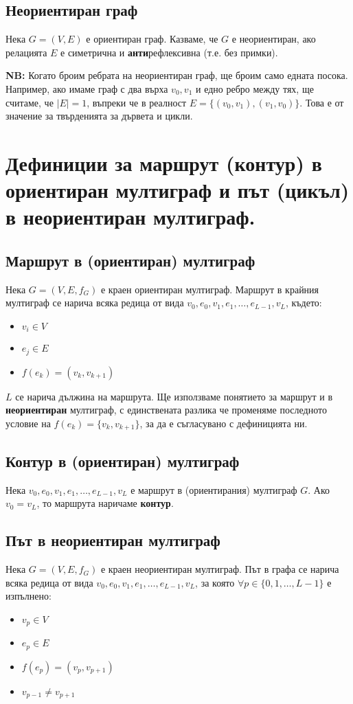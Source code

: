 \documentclass[fleqn,12pt]{article}
\begin{document}
\subsection{Неориентиран граф}
Нека $G = (V, E)$ е ориентиран граф. Казваме, че $G$ е неориентиран, ако релацията $E$ е симетрична и \textbf{анти}рефлексивна (т.е. без примки).

\textbf{NB: } Когато броим ребрата на неориентиран граф, ще броим само едната посока. Например, ако имаме граф с два върха $v_0, v_1$ 
и едно ребро между тях, ще считаме, че $|E| = 1$, въпреки че в реалност $E = \{ (v_0, v_1), (v_1, v_0) \}$. Това е от значение за 
твърденията за дървета и цикли.

\section{Дефиниции за маршрут (контур) в ориентиран мултиграф и път (цикъл) в неориентиран мултиграф.}
\subsection{Маршрут в (ориентиран) мултиграф}
Нека $G = (V, E, f_G)$ е краен ориентиран мултиграф. Маршрут в крайния мултиграф се нарича всяка
редица от вида $v_0, e_0, v_1, e_1, \dots , e_{L-1} , v_L$, където:
\begin{itemize}
	\item $v_i \in V$
	\item $e_j \in E$
	\item $f(e_k) = (v_k, v_{k+1})$
\end{itemize} 
 
$L$ се нарича дължина на маршрута. Ще използваме понятието за маршрут и в \textbf{неориентиран} мултиграф, с единствената разлика че 
променяме последното условие на $f(e_k) = \{v_k, v_{k+1}\}$, за да е съгласувано с дефиницията ни.

\subsection{Контур в (ориентиран) мултиграф}
Нека $v_0, e_0, v_1, e_1, \dots , e_{L-1} , v_L$ е маршрут в (ориентирания) мултиграф $G$. Ако $v_0 = v_L$, то маршрута наричаме \textbf{контур}.

\subsection{Път в неориентиран мултиграф}
Нека $G = (V, E, f_G)$ е краен неориентиран мултиграф. Път в графа се нарича всяка редица от вида
$v_0, e_0, v_1, e_1, \dots , e_{L-1} , v_L$, за която $\forall p \in \{ 0, 1, \dots, L - 1 \}$ е изпълнено:
\begin{itemize}
	\item $v_p \in V$
	\item $e_p \in E$
	\item $f(e_p) = (v_p, v_{p+1})$
	\item $v_{p-1} \neq v_{p+1}$
\end{itemize}
\end{document}
